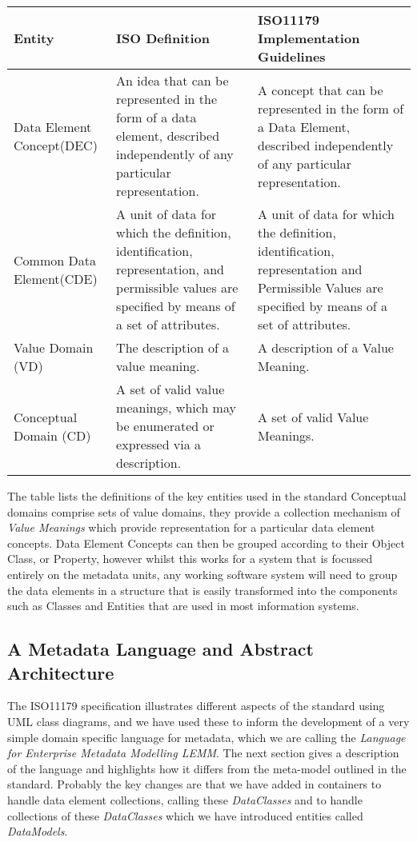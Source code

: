 \begin{table}[h]
	\begin{tabular}{ p{1.8cm} p{2.8cm}  p{3.0cm}  }  %
		\hline
		Entity & ISO Definition & ISO11179 Implementation Guidelines  \\ 
		\hline
		Data Element Concept(DEC) & An idea that can be represented in the form of a data element, described independently of any particular representation. & A concept that can be represented in the form of a Data Element, described independently of any particular representation.\\
		Common Data Element(CDE) & A unit of data for which the definition, identification, representation, and permissible values are specified by means of a set of attributes. & A unit of data for which the definition, identification, representation and Permissible Values are specified by means of a set of attributes. \\
		Value Domain (VD) & The description of a value meaning. & A description of a Value Meaning. \\
		Conceptual Domain (CD) & A set of valid value meanings, which may be enumerated or expressed via a description.& A set of valid Value Meanings.\\
		\hline
	\end{tabular}
\end{table}

The table lists the definitions of the key entities used in the standard
Conceptual domains comprise sets of value domains, they provide a collection mechanism of \emph{Value Meanings} which provide representation for a particular data element concepts. Data Element Concepts can then be grouped according to their Object Class, or Property, however whilst this works for a system that is focussed entirely on the metadata units, any working software system will need to group the data elements in a structure that is easily transformed into the components such as Classes and Entities that are used in most information systems.   



\subsection{A Metadata Language and Abstract Architecture }

The ISO11179 specification illustrates different aspects of the standard using UML class diagrams, and we have used these to inform the development of a very simple domain specific language for metadata, which we are calling the \emph{Language for Enterprise Metadata Modelling LEMM}. The next section gives a description of the language and highlights how it differs from the meta-model outlined in the standard. Probably the key changes are that we have added in containers to handle data element collections, calling these \emph{DataClasses} and to handle collections of these \emph{DataClasses} which we have introduced entities called \emph{DataModels}.

